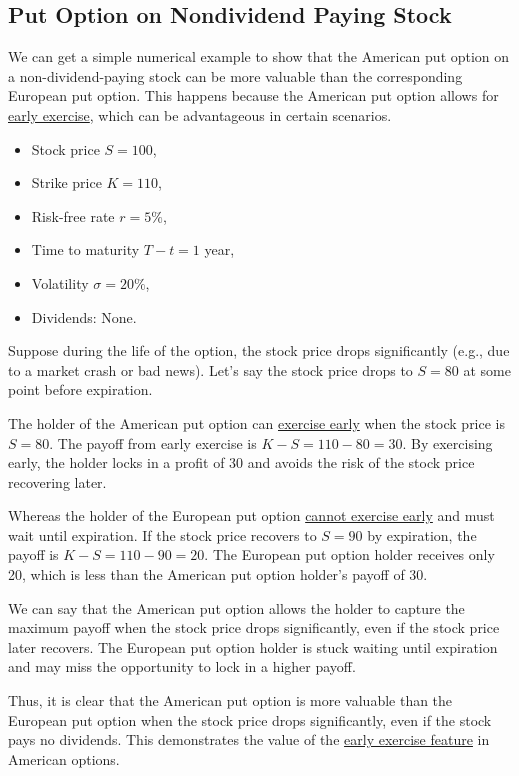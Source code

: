 \documentclass[letterpaper]{article}
\begin{document}
		\subsection{Put Option on Nondividend Paying Stock}
			
			
			We can get a simple numerical example to show that the {American put option} on a non-dividend-paying stock can be more valuable than the corresponding {European put option}. This happens because the American put option allows for \underline{early exercise}, which can be advantageous in certain scenarios.
			
			\begin{itemize}
				\item Stock price \( S = 100 \),
				\item Strike price \( K = 110 \),
				\item Risk-free rate \( r = 5\% \),
				\item Time to maturity \( T - t = 1 \) year,
				\item Volatility \( \sigma = 20\% \),
				\item Dividends: None.
			\end{itemize}
			
			
			Suppose during the life of the option, the stock price drops significantly (e.g., due to a market crash or bad news). Let’s say the stock price drops to \( S = 80 \) at some point before expiration.
			
		The holder of the American put option can \underline{exercise early} when the stock price is \( S = 80 \). The payoff from early exercise is $K - S = 110 - 80 = 30$. By exercising early, the holder locks in a profit of {30} and avoids the risk of the stock price recovering later.
			
		Whereas the holder of the European put option \underline{cannot exercise early} and must wait until expiration. If the stock price recovers to \( S = 90 \) by expiration, the payoff is $
				K - S = 110 - 90 = 20$. The European put option holder receives only {20}, which is less than the American put option holder’s payoff of {30}.
			
				We can say that the American put option allows the holder to {capture the maximum payoff} when the stock price drops significantly, even if the stock price later recovers. The European put option holder is {stuck waiting until expiration} and may miss the opportunity to lock in a higher payoff.
			

			
			Thus, it is clear that the {American put option is more valuable} than the European put option when the stock price drops significantly, even if the stock pays no dividends. This demonstrates the value of the \underline{early exercise feature} in American options.
			
\end{document}
